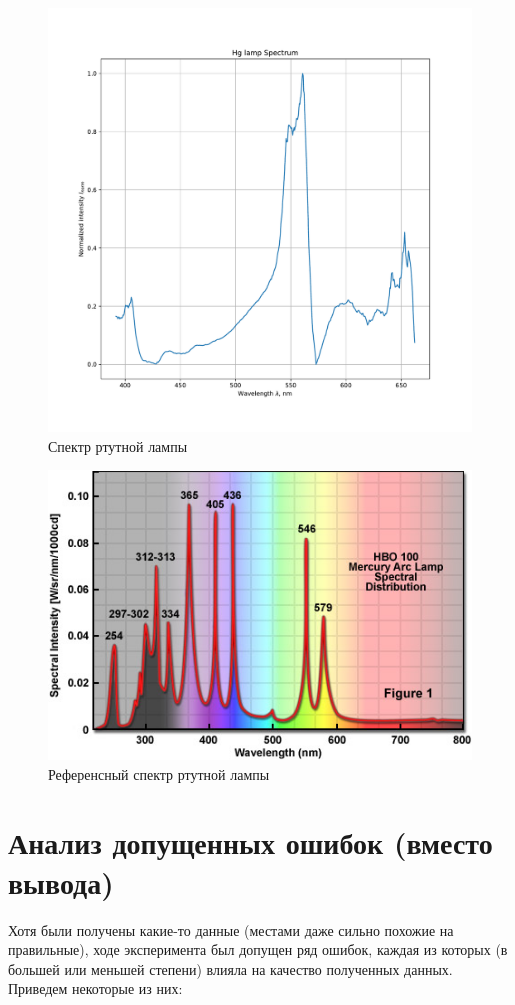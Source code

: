 \documentclass[a4paper, 12pt]{article}
\begin{document}
\begin{figure}[H]
	\centering
	\includegraphics[width=0.7\linewidth]{Hg.pdf}
	\caption{Спектр ртутной лампы}
	\label{fig:Hg}
\end{figure}

\begin{figure}[H]
	\centering
	\includegraphics[width=0.7\linewidth]{hg_ref}
	\caption{Референсный спектр ртутной лампы}
	\label{fig:hg_ref}
\end{figure}

\section{Анализ допущенных ошибок (вместо вывода)}

Хотя были получены какие-то данные (местами даже сильно похожие на правильные), ходе эксперимента был допущен ряд ошибок, каждая из которых (в большей или меньшей степени) влияла на качество полученных данных. Приведем некоторые из них:
\end{document}

